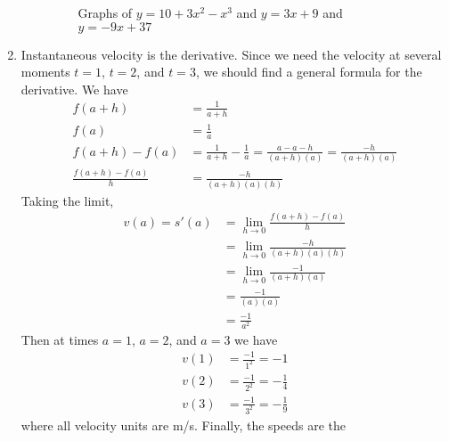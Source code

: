 \documentclass{article}
\begin{document}
\begin{enumerate}
\begin{enumerate}
    \begin{figure}[htbp]
      \centering
      \caption{Graphs of $y=10+3x^2-x^3$ and $y=3x+9$ and $y=-9x+37$}
      \label{fig:graphCubic}
    \end{figure}
  \end{enumerate}
\item %
  Instantaneous velocity is the derivative.  Since we need the
  velocity at several moments $t=1$, $t=2$, and $t=3$, we should find
  a general formula for the derivative.  We have
  \begin{align*}
    f(a+h) &= \frac{1}{a+h} \\
    f(a) &= \frac{1}{a} \\
    f(a+h)-f(a) &= \frac{1}{a+h} - \frac{1}{a} = \frac{a - a - h}{(a+h)(a)}
                  = \frac{-h}{(a+h)(a)} \\
    \frac{f(a+h)-f(a)}{h} &= \frac{-h}{(a+h)(a)(h)}
  \end{align*}
  Taking the limit,
  \begin{align*}
    v(a) = s'(a) &= \lim_{h\to 0} \frac{f(a+h)-f(a)}{h} \\
    &= \lim_{h\to 0} \frac{-h}{(a+h)(a)(h)} \\
    &= \lim_{h\to 0} \frac{-1}{(a+h)(a)} \\
    &= \frac{-1}{(a)(a)} \\
    &= \frac{-1}{a^2}
  \end{align*}
  Then at times $a=1$, $a=2$, and $a=3$ we have
  \begin{align*}
    v(1) &= \frac{-1}{1^2} = -1 \\
    v(2) &= \frac{-1}{2^2} = -\frac{1}{4} \\
    v(3) &= \frac{-1}{3^2} = -\frac{1}{9}
  \end{align*}
  where all velocity units are m/s.  Finally, the speeds are the

\end{enumerate}
\end{document}

